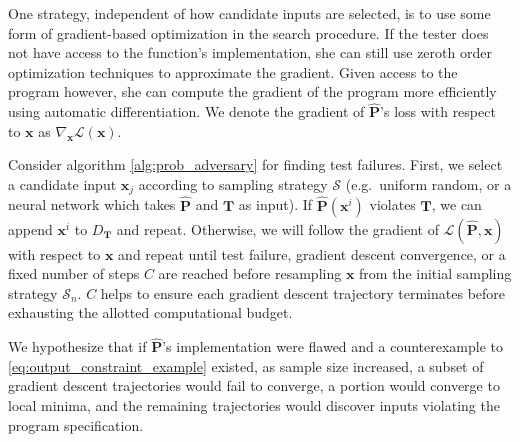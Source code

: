 \documentclass[12pt,initial,twoside,maitrise]{dms}
\numberwithin{equation}{section}
\numberwithin{table}{chapter}
\numberwithin{figure}{chapter}
\begin{document}

One strategy, independent of how candidate inputs are selected, is to use some form of gradient-based optimization in the search procedure. If the tester does not have access to the function's implementation, she can still use zeroth order optimization techniques to approximate the gradient. Given access to the program however, she can compute the gradient of the program more efficiently using automatic differentiation. We denote the gradient of $\mathbf{\hat P}$'s loss with respect to $\mathbf{x}$ as $\nabla_{\mathbf{x}} \mathcal{L}(\mathbf x)$.
%

%
%

Consider algorithm \autoref{alg:prob_adversary} for finding test failures. First, we select a candidate input $\mathbf{x}_j$ according to sampling strategy $\mathcal S$ (e.g.\ uniform random, or a neural network which takes $\mathbf{\hat P}$ and $\mathbf T$ as input). If $\mathbf{\hat P}(\mathbf{x}^i)$ violates $\mathbf T$, we can append $\mathbf x^i$ to $D_\mathbf T$ and repeat. Otherwise, we will follow the gradient of $\mathcal{L}(\mathbf{\hat P}, \mathbf{x})$ with respect to $\mathbf{x}$ and repeat until test failure, gradient descent convergence, or a fixed number of steps $C$ are reached before resampling $\mathbf{x}$ from the initial sampling strategy $\mathcal S_n$. $C$ helps to ensure each gradient descent trajectory terminates before exhausting the allotted computational budget.

We hypothesize that if $\mathbf{\hat P}$'s implementation were flawed and a counterexample to \autoref{eq:output_constraint_example} existed, as sample size increased, a subset of gradient descent trajectories would fail to converge, a portion would converge to local minima, and the remaining trajectories would discover inputs violating the program specification.
\end{document}
